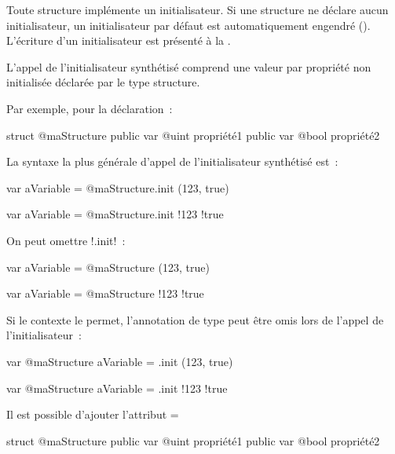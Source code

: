 Toute structure implémente un initialisateur. Si une structure ne déclare aucun initialisateur, un initialisateur par défaut est automatiquement engendré (). L'écriture d'un initialisateur est présenté à la .


L'appel de l'initialisateur synthétisé comprend une valeur par propriété non initialisée déclarée par le type structure.

Par exemple, pour la déclaration~:
\begin{galgas34}
struct @maStructure {
  public var @uint propriété1
  public var @bool propriété2
}
\end{galgas34}

La syntaxe la plus générale d'appel de l'initialisateur synthétisé est~:
\begin{galgas4}
var aVariable = @maStructure.init (123, true)
\end{galgas4}
\begin{galgas3}
var aVariable = @maStructure.init {!123 !true}
\end{galgas3}

On peut omettre \ggst!.init!~:
\begin{galgas4}
var aVariable = @maStructure (123, true)
\end{galgas4}
\begin{galgas3}
var aVariable = @maStructure {!123 !true}
\end{galgas3}


Si le contexte le permet, l'annotation de type peut être omis lors de l'appel de l'initialisateur~:
\begin{galgas4}
var @maStructure aVariable = .init (123, true)
\end{galgas4}
\begin{galgas3}
var @maStructure aVariable = .init {!123 !true}
\end{galgas3}


Il est possible d'ajouter l'attribut \ggst=%
\begin{galgas3}
struct @maStructure {
  public var @uint propriété1 %
  public var @bool propriété2
}
\end{galgas3}

